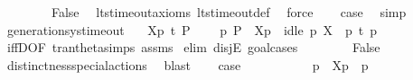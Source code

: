 \begin{isabellebody}
\ \ \isamarkupfalse%
\ {}\isanewline
\ \ \isamarkupfalse%
\ False\ \isamarkupfalse%
\ lts{\isacharunderscore}{\kern0pt}timeout{\isacharunderscore}{\kern0pt}axioms\ lts{\isacharunderscore}{\kern0pt}timeout{\isacharunderscore}{\kern0pt}def\ \isamarkupfalse%
\ force\isanewline
\ \ \isamarkupfalse%
\ {\isacharquery}{\kern0pt}case\ \isamarkupfalse%
\ simp\isanewline
{}\isamarkupfalse%
%
\endisatagproof
{\isafoldproof}%
%
\isadelimproof
\isanewline
%
\endisadelimproof
\isanewline
{}\isamarkupfalse%
\ generation{\isacharunderscore}{\kern0pt}sys{\isacharunderscore}{\kern0pt}timeout{\isacharcolon}{\kern0pt}\isanewline
\ \ \ {\isacartoucheopen}{\isasymtheta}{\isacharbrackleft}{\kern0pt}X{\isacharbrackright}{\kern0pt}{\isacharparenleft}{\kern0pt}p{\isacharparenright}{\kern0pt}\ {\isasymlongmapsto}\isactrlsup {\isasymtheta}t\ P{\isacharprime}{\kern0pt}{\isacartoucheclose}\isanewline
\ \ \ {\isacartoucheopen}{\isasymexists}\ p{\isacharprime}{\kern0pt}{\isachardot}{\kern0pt}\ P{\isacharprime}{\kern0pt}\ {\isacharequal}{\kern0pt}\ {\isasymtheta}{\isacharbrackleft}{\kern0pt}X{\isacharbrackright}{\kern0pt}{\isacharparenleft}{\kern0pt}p{\isacharprime}{\kern0pt}{\isacharparenright}{\kern0pt}\ {\isasymand}\ idle\ p\ X\ {\isasymand}\ p\ {\isasymlongmapsto}t\ p{\isacharprime}{\kern0pt}{\isacartoucheclose}\isanewline
%
\isadelimproof
\ \ %
\endisadelimproof
%
\isatagproof
{}\isamarkupfalse%
\ iffD{}{\isacharbrackleft}{\kern0pt}OF\ tran{\isacharunderscore}{\kern0pt}theta{\isachardot}{\kern0pt}simps\ assms{\isacharbrackright}{\kern0pt}\isanewline
{}\isamarkupfalse%
\ {\isacharparenleft}{\kern0pt}elim\ disjE{\isacharcomma}{\kern0pt}\ goal{\isacharunderscore}{\kern0pt}cases{\isacharparenright}{\kern0pt}\isanewline
\ \ \isamarkupfalse%
\ {}\isanewline
\ \ \isamarkupfalse%
\ False\ \isamarkupfalse%
\ distinctness{\isacharunderscore}{\kern0pt}special{\isacharunderscore}{\kern0pt}actions\ \isamarkupfalse%
\ blast\isanewline
\ \ \isamarkupfalse%
\ {\isacharquery}{\kern0pt}case\ \isacommand{{\isachardot}{\kern0pt}{\isachardot}{\kern0pt}}\isamarkupfalse%
\isanewline
{}\isamarkupfalse%
\isanewline
\ \ \isamarkupfalse%
\ {}\isanewline
\ \ \isamarkupfalse%
\ \isamarkupfalse%
\ p{\isacharprime}{\kern0pt}\ \ {\isacartoucheopen}{\isasymtheta}{\isacharbrackleft}{\kern0pt}X{\isacharbrackright}{\kern0pt}{\isacharparenleft}{\kern0pt}p{\isacharparenright}{\kern0pt}\ {\isacharequal}{\kern0pt}\ {\isasymtheta}{\isacharparenleft}{\kern0pt}p{\isacharprime}{\kern0pt}{\isacharparenright}{\kern0pt}{\isacartoucheclose}\ \isamarkupfalse%

\end{isabellebody}
